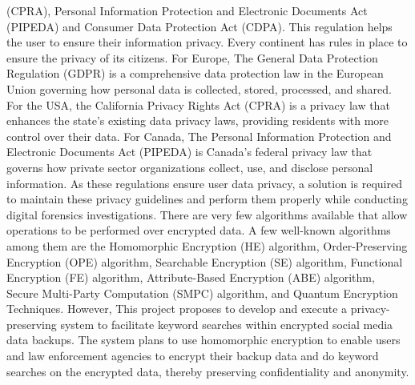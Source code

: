 \documentclass[conference]{IEEEtran}
\begin{document}
(CPRA), Personal Information Protection and Electronic Documents Act (PIPEDA) and Consumer Data Protection Act (CDPA). This regulation helps the user to ensure their information privacy. Every continent has rules in place to ensure the privacy of its citizens. For Europe, The General Data Protection Regulation (GDPR) is a comprehensive data protection law in the European Union governing how personal data is collected, stored, processed, and shared. For the USA, the California Privacy Rights Act (CPRA) is a privacy law that enhances the state's existing data privacy laws, providing residents with more control over their data. For Canada, The Personal Information Protection and Electronic Documents Act (PIPEDA) is Canada's federal privacy law that governs how private sector organizations collect, use, and disclose personal information. As these regulations ensure user data privacy, a solution is required to maintain these privacy guidelines and perform them properly while conducting digital forensics investigations. There are very few algorithms available that allow operations to be performed over encrypted data. A few well-known algorithms among them are the Homomorphic Encryption (HE) algorithm,  Order-Preserving Encryption (OPE) algorithm, Searchable Encryption (SE) algorithm, Functional Encryption (FE) algorithm, Attribute-Based Encryption (ABE) algorithm, Secure Multi-Party Computation (SMPC) algorithm, and Quantum Encryption Techniques. However, This project proposes to develop and execute a privacy-preserving system to facilitate keyword searches within encrypted social media data backups. The system plans to use homomorphic encryption to enable users and law enforcement agencies to encrypt their backup data and do keyword searches on the encrypted data, thereby preserving confidentiality and anonymity. 
\end{document}

